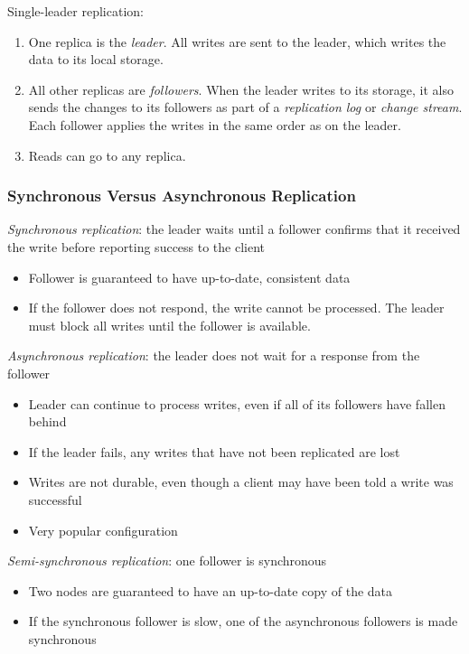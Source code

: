 \documentclass[12pt, titlepage]{article}
\begin{document}
Single-leader replication:

\begin{enumerate}
	\item One replica is the \textit{leader}. All writes are sent to the leader, which writes the data to its local storage.
	\item All other replicas are \textit{followers}. When the leader writes to its storage, it also sends the changes to its followers as part of a \textit{replication log} or \textit{change stream}. Each follower applies the writes in the same order as on the leader.
	\item Reads can go to any replica.
\end{enumerate}

\subsubsection{Synchronous Versus Asynchronous Replication}

\textit{Synchronous replication}: the leader waits until a follower confirms that it received the write before reporting success to the client
\begin{itemize}
	\item Follower is guaranteed to have up-to-date, consistent data
	\item If the follower does not respond, the write cannot be processed. The leader must block all writes until the follower is available.
\end{itemize}

\textit{Asynchronous replication}: the leader does not wait for a response from the follower
\begin{itemize}
    \item Leader can continue to process writes, even if all of its followers have fallen behind
	\item If the leader fails, any writes that have not been replicated are lost
	\item Writes are not durable, even though a client may have been told a write was successful
	\item Very popular configuration
\end{itemize}

\textit{Semi-synchronous replication}: one follower is synchronous
\begin{itemize}
	\item Two nodes are guaranteed to have an up-to-date copy of the data
	\item If the synchronous follower is slow, one of the asynchronous followers is made synchronous
\end{itemize}
\end{document}

